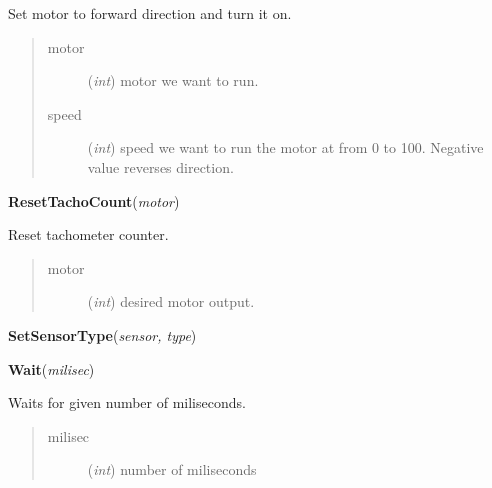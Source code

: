 \documentclass[10pt,a4paper]{article}
\begin{document}
    Set motor to forward direction and turn it on.
    





\begin{quote}
    \begin{description}
        
\item[motor] ({\emph{int}}) motor we want to run.

\item[speed] ({\emph{int}}) speed we want to run the motor at from 0 to 100. Negative value reverses direction.   

    \end{description}
\end{quote}

 

\vspace{6pt}
{\bf ResetTachoCount}({\it motor}) 
    
    Reset tachometer counter. 





\begin{quote}
    \begin{description}
        
\item[motor] ({\emph{int}}) desired motor output.

    \end{description}
\end{quote}

 

\vspace{6pt}
{\bf SetSensorType}({\it sensor, type}) 

 

\vspace{6pt}
{\bf Wait}({\it milisec}) 
    
    Waits for given number of miliseconds.





\begin{quote}
    \begin{description}
        
\item[milisec] ({\emph{int}}) number of miliseconds

    \end{description}
\end{quote}

 
\end{document}
